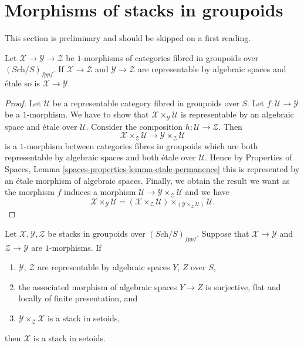 \section{Morphisms of stacks in groupoids}
\label{section-1-morphisms}

\noindent
This section is preliminary and should be skipped on a first reading.

\begin{lemma}
\label{lemma-etale-permanence}
Let $\mathcal{X} \to \mathcal{Y} \to \mathcal{Z}$
be $1$-morphisms of categories fibred in groupoids over
$(\textit{Sch}/S)_{fppf}$.
If $\mathcal{X} \to \mathcal{Z}$ and $\mathcal{Y} \to \mathcal{Z}$ are
representable by algebraic spaces and \'etale so is
$\mathcal{X} \to \mathcal{Y}$.
\end{lemma}

\begin{proof}
Let $\mathcal{U}$ be a representable category fibred in groupoids over $S$.
Let $f : \mathcal{U} \to \mathcal{Y}$ be a $1$-morphism. We have to show that
$\mathcal{X} \times_{\mathcal{Y}} \mathcal{U}$ is representable by an
algebraic space and \'etale over $\mathcal{U}$.
Consider the composition $h : \mathcal{U} \to \mathcal{Z}$. Then
$$
\mathcal{X} \times_{\mathcal{Z}} \mathcal{U}
\longrightarrow
\mathcal{Y} \times_{\mathcal{Z}} \mathcal{U}
$$
is a $1$-morphism between categories fibres in groupoids which are both
representable by algebraic spaces and both \'etale over $\mathcal{U}$.
Hence by
Properties of Spaces, Lemma \ref{spaces-properties-lemma-etale-permanence}
this is represented by an \'etale morphism of algebraic spaces.
Finally, we obtain the result we want as the morphism $f$ induces
a morphism $\mathcal{U} \to \mathcal{Y} \times_{\mathcal{Z}} \mathcal{U}$
and we have
$$
\mathcal{X} \times_{\mathcal{Y}} \mathcal{U} =
(\mathcal{X} \times_{\mathcal{Z}} \mathcal{U})
\times_{(\mathcal{Y} \times_{\mathcal{Z}} \mathcal{U})}
\mathcal{U}.
$$
\end{proof}

\begin{lemma}
\label{lemma-stack-in-setoids-descent}
Let $\mathcal{X}, \mathcal{Y}, \mathcal{Z}$ be stacks in groupoids
over $(\textit{Sch}/S)_{fppf}$. Suppose that $\mathcal{X} \to \mathcal{Y}$
and $\mathcal{Z} \to \mathcal{Y}$ are $1$-morphisms.
If
\begin{enumerate}
\item $\mathcal{Y}$, $\mathcal{Z}$ are representable by algebraic spaces
$Y$, $Z$ over $S$,
\item the associated morphism of algebraic spaces $Y \to Z$ is surjective,
flat and locally of finite presentation, and
\item $\mathcal{Y} \times_{\mathcal{Z}} \mathcal{X}$ is a stack in
setoids,
\end{enumerate}
then $\mathcal{X}$ is a stack in setoids.
\end{lemma}

